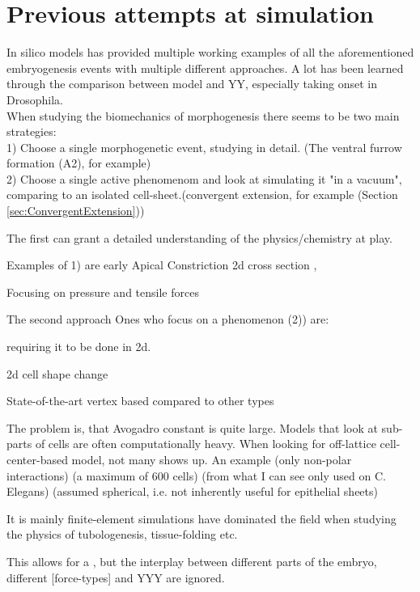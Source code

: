 \section{Previous attempts at simulation}
In silico models has provided multiple working examples of all the aforementioned embryogenesis events with multiple different approaches. A lot has been learned through the comparison between model and YY, especially taking onset in Drosophila.\\
When studying the biomechanics of morphogenesis there seems to be two main strategies:\\
1) Choose a single morphogenetic event, studying in detail. (The ventral furrow formation (A2), for example)\\
2) Choose a single active phenomenom and look at simulating it "in a vacuum", comparing to an isolated cell-sheet.(convergent extension, for example (Section \ref{sec:ConvergentExtension})) 


The first can grant a detailed understanding of the physics/chemistry at play.

Examples of 1) are early Apical Constriction 2d cross section \cite{odell1981mechanical}, 

Focusing on pressure and tensile forces 

The second approach 
Ones who focus on a phenomenon (2)) are: 

requiring it to be done in 2d.



2d cell shape change \cite{krajnc2018fluidization}

State-of-the-art vertex based compared to other types \cite{fletcher2017mechanocellular}

The problem is, that Avogadro constant is quite large. Models that look at sub-parts of cells are often computationally heavy. When looking for off-lattice cell-center-based model, not many shows up. An example (only non-polar interactions) (a maximum of 600 cells) (from what I can see only used on C. Elegans) (assumed spherical, i.e. not inherently useful for epithelial sheets)\cite{atwell2015mechano}


It is mainly finite-element simulations have dominated the field when studying the physics of tubologenesis, tissue-folding etc.  

This allows for a , but the interplay between different parts of the embryo, different [force-types] and YYY are ignored.  



